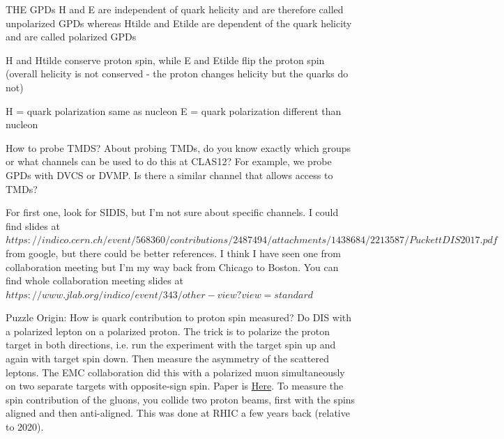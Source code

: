         
    
            THE GPDs H and E are independent of quark helicity and are therefore called unpolarized GPDs whereas Htilde and Etilde are dependent of the quark helicity and are called polarized GPDs
            
            H and Htilde conserve proton spin, while E and Etilde flip the proton spin (overall helicity is not conserved - the proton changes helicity but the quarks do not) 
            
            
            H = quark polarization same as nucleon
            E = quark polarization different than nucleon

            \fi


              How to probe TMDS?
            About probing TMDs, do you know exactly which groups or what channels can be used to do this at CLAS12? For example, we probe GPDs with DVCS or DVMP. Is there a similar channel that allows access to TMDs?
            
            For first one, look for SIDIS, but I'm not sure about specific channels. I could find slides at
            $https://indico.cern.ch/event/568360/contributions/2487494/attachments/1438684/2213587/PuckettDIS2017.pdf$ from google, but there could be better references. I think I have seen one from collaboration meeting but I'm my way back from Chicago to Boston. You can find whole collaboration meeting slides at $https://www.jlab.org/indico/event/343/other-view?view=standard$
    
            Puzzle Origin: How is quark contribution to proton spin measured?
            Do DIS with a polarized lepton on a polarized proton. The trick is to polarize the proton target in both directions, i.e. run the experiment with the target spin up and again with target spin down. Then measure the asymmetry of the scattered leptons. The EMC collaboration did this with a polarized muon simultaneously on two separate targets with opposite-sign spin. Paper is \href{https://www-sciencedirect-com.libproxy.mit.edu/science/article/pii/0550321389900898?via\%3Dihub}{Here}. To measure the spin contribution of the gluons, you collide two proton beams, first with the spins aligned and then anti-aligned. This was done at RHIC a few years back (relative to 2020). 

    
            
\fi
